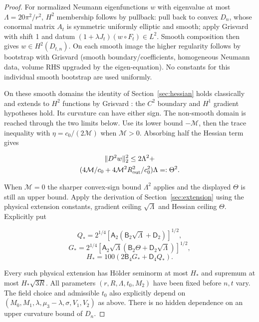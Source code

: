 \documentclass[11pt]{article}
\theoremstyle{definition}
\theoremstyle{remark}
\numberwithin{equation}{section}
\begin{document}
\begin{proof}
For normalized Neumann eigenfunctions $w$ with eigenvalue at most $\Lambda=20\pi^2/r^2$, $H^2$ membership follows by pullback: pull back to convex $D_n$, whose conormal matrix $A_t$ is symmetric uniformly elliptic and smooth; apply Grisvard \cite[Theorem~3.2.1.3]{Grisvard} with shift 1 and datum $(1+\lambda J_t)(w\circ F_t)\in L^2$. Smooth composition then gives $w\in H^2(D_{t,n})$. On each smooth image the higher regularity follows by bootstrap with Grisvard \cite[Theorem~2.5.1.1, pp.~128--129]{Grisvard} (smooth boundary/coefficients, homogeneous Neumann data, volume RHS upgraded by the eigen-equation). No constants for this individual smooth bootstrap are used uniformly.

On these smooth domains the identity of Section~\ref{sec:hessian} holds classically and extends to $H^2$ functions by Grisvard \cite[Theorem~3.1.1.1]{Grisvard}: the $C^2$ boundary and $H^1$ gradient hypotheses hold. Its curvature can have either sign. The non-smooth domain is reached through the two limits below. Use its lower bound $-\mathcal M$, then the trace inequality with $\eta=c_0/(2\mathcal M)$ when $\mathcal M>0$. Absorbing half the Hessian term gives

\begin{equation}\label{eq:src-11-24}
\begin{gathered}
\|D^2w\|_2^2\le2\Lambda^2+ \\
(4\mathcal M/c_0+4\mathcal M^2R_{\rm out}^2/c_0^2)\Lambda=:\Theta^2.
\end{gathered}
\end{equation}

When $\mathcal M=0$ the sharper convex-sign bound $\Lambda^2$ applies and the displayed $\Theta$ is still an upper bound. Apply the derivation of Section~\ref{sec:extension} using the physical extension constants, gradient ceiling $\sqrt\Lambda$ and Hessian ceiling $\Theta$. Explicitly put

\begin{equation}\label{eq:src-11-25}
Q_*=2^{1/4}[\mathsf A_2(\mathsf B_2\sqrt\Lambda+\mathsf D_2)]^{1/2},
\end{equation}
\begin{equation}\label{eq:src-11-26}
G_*=2^{1/4}[\mathsf A_2\sqrt\Lambda(\mathsf B_2\Theta+\mathsf D_2\sqrt\Lambda)]^{1/2},
\end{equation}
\begin{equation}\label{eq:src-11-27}
H_*=100(2\mathsf B_4G_*+\mathsf D_4Q_*).
\end{equation}

Every such physical extension has H\"older seminorm at most $H_*$ and supremum at most $H_*\sqrt{3R}$. All parameters $(r,R,\Lambda,t_0,M_2)$ have been fixed before $n,t$ vary. The field choice and admissible $t_0$ also explicitly depend on $(M_0,M_1,\lambda,\mu_3-\lambda,\sigma,V_1,V_2)$ as above. There is no hidden dependence on an upper curvature bound of $D_n$.

\end{proof}
\end{document}

